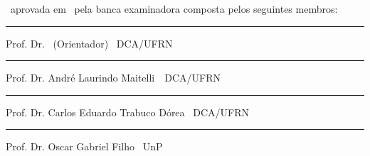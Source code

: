 \begin{titlepage}
\begin{center}

\LARGE

\textbf{\titulo}

\vfill

\Large

\textbf{\autor}

\end{center}

\vfill

\noindent
\documento\ aprovada em \dataaprovacao\ pela banca examinadora composta pelos
seguintes membros:

\begin{center}


\vspace{1.5cm}\rule{0.95\linewidth}{1pt}
\parbox{0.9\linewidth}{%
Prof. Dr. \orientador\ (Orientador) \dotfill\ DCA/UFRN}

\vspace{1.5cm}\rule{0.95\linewidth}{1pt}
\parbox{0.9\linewidth}{%
Prof. Dr. André Laurindo Maitelli\ \dotfill\ DCA/UFRN}

\vspace{1.5cm}\rule{0.95\linewidth}{1pt}
\parbox{0.9\linewidth}{%
Prof. Dr. Carlos Eduardo Trabuco Dórea \dotfill\ DCA/UFRN}

\vspace{1.5cm}\rule{0.95\linewidth}{1pt}
\parbox{0.9\linewidth}{%
Prof. Dr. Oscar Gabriel Filho \dotfill\ UnP}

\end{center}
\end{titlepage}
